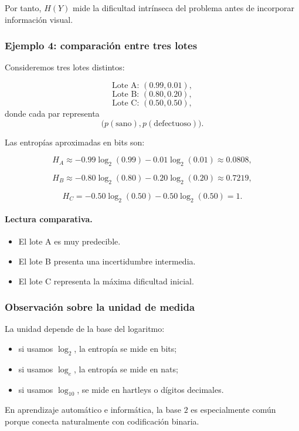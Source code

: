 \documentclass{article}
\begin{document}
Por tanto, \(H(Y)\) mide la dificultad intrínseca del problema antes de incorporar información visual.

\subsubsection*{Ejemplo 4: comparación entre tres lotes}

Consideremos tres lotes distintos:

\[
\text{Lote A: } (0.99,0.01),
\]
\[
\text{Lote B: } (0.80,0.20),
\]
\[
\text{Lote C: } (0.50,0.50),
\]
donde cada par representa
\[
\bigl(p(\text{sano}),p(\text{defectuoso})\bigr).
\]

Las entropías aproximadas en bits son:

\[
H_A \approx -0.99\log_2(0.99)-0.01\log_2(0.01)\approx 0.0808,
\]

\[
H_B \approx -0.80\log_2(0.80)-0.20\log_2(0.20)\approx 0.7219,
\]

\[
H_C = -0.50\log_2(0.50)-0.50\log_2(0.50)=1.
\]

\paragraph{Lectura comparativa.}
\begin{itemize}
\item El lote A es muy predecible.
\item El lote B presenta una incertidumbre intermedia.
\item El lote C representa la máxima dificultad inicial.
\end{itemize}

\subsubsection*{Observación sobre la unidad de medida}

La unidad depende de la base del logaritmo:

\begin{itemize}
\item si usamos \(\log_2\), la entropía se mide en bits;
\item si usamos \(\log_e\), la entropía se mide en nats;
\item si usamos \(\log_{10}\), se mide en hartleys o dígitos decimales.
\end{itemize}

En aprendizaje automático e informática, la base \(2\) es especialmente común porque conecta naturalmente con codificación binaria.
\end{document}
